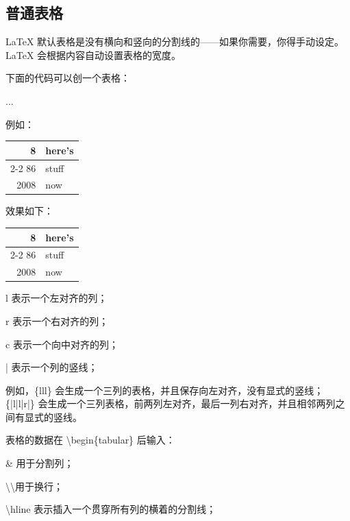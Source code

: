 \subsection{普通表格}

LaTeX 默认表格是没有横向和竖向的分割线的——如果你需要，你得手动设定。LaTeX 会根据内容自动设置表格的宽度。

下面的代码可以创一个表格：

\begin{python}
\begin{tabular}{...}
\end{tabular}
\end{python}

例如：

\begin{python}
\begin{center}
\begin{tabular}{|r|l|}
	\hline
	8              & here's \\
	\cline{2-2}
	86 & stuff  \\
	\hline
	2008           & now    \\
	\hline
\end{tabular}
\end{center}
\end{python}

效果如下：

\begin{center}
\begin{tabular}{|r|l|}
	\hline
	8              & here's \\
	\cline{2-2}
	86 & stuff  \\
	\hline
	2008           & now    \\
	\hline
\end{tabular}
\end{center}

l 表示一个左对齐的列；

r 表示一个右对齐的列；

c 表示一个向中对齐的列；

| 表示一个列的竖线；

例如，\{lll\} 会生成一个三列的表格，并且保存向左对齐，没有显式的竖线；\{|l|l|r|\} 会生成一个三列表格，前两列左对齐，最后一列右对齐，并且相邻两列之间有显式的竖线。

表格的数据在 \textbackslash begin\{tabular\} 后输入：

\& 用于分割列；

\textbackslash \textbackslash 用于换行；

\textbackslash hline 表示插入一个贯穿所有列的横着的分割线；

